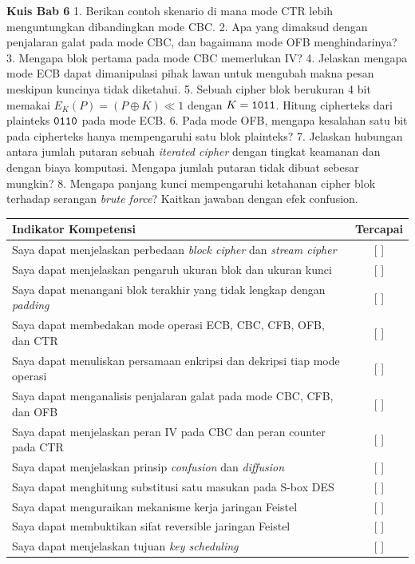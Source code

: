 
\begin{obeassessment}
\textbf{Kuis Bab 6}
1. Berikan contoh skenario di mana mode CTR lebih menguntungkan dibandingkan
   mode CBC.
2. Apa yang dimaksud dengan penjalaran galat pada mode CBC, dan bagaimana mode
   OFB menghindarinya?
3. Mengapa blok pertama pada mode CBC memerlukan IV?
4. Jelaskan mengapa mode ECB dapat dimanipulasi pihak lawan untuk mengubah
   makna pesan meskipun kuncinya tidak diketahui.
5. Sebuah cipher blok berukuran 4 bit memakai $E_K(P)=(P\oplus K)\ll 1$ dengan
   $K=\texttt{1011}$. Hitung cipherteks dari plainteks $\texttt{0110}$ pada mode
   ECB.
6. Pada mode OFB, mengapa kesalahan satu bit pada cipherteks hanya mempengaruhi
   satu blok plainteks?
7. Jelaskan hubungan antara jumlah putaran sebuah \textit{iterated cipher}
   dengan tingkat keamanan dan dengan biaya komputasi. Mengapa jumlah putaran
   tidak dibuat sebesar mungkin?
8. Mengapa panjang kunci mempengaruhi ketahanan cipher blok terhadap serangan
   \textit{brute force}? Kaitkan jawaban dengan efek confusion.
\end{obeassessment}
\begin{competencychecklist}
\begin{tabularx}{\linewidth}{|X|c|}
\hline
Indikator Kompetensi & Tercapai \\
\hline
Saya dapat menjelaskan perbedaan \textit{block cipher} dan \textit{stream cipher} & [ ] \\
\hline
Saya dapat menjelaskan pengaruh ukuran blok dan ukuran kunci & [ ] \\
\hline
Saya dapat menangani blok terakhir yang tidak lengkap dengan \textit{padding} & [ ] \\
\hline
Saya dapat membedakan mode operasi ECB, CBC, CFB, OFB, dan CTR & [ ] \\
\hline
Saya dapat menuliskan persamaan enkripsi dan dekripsi tiap mode operasi & [ ] \\
\hline
Saya dapat menganalisis penjalaran galat pada mode CBC, CFB, dan OFB & [ ] \\
\hline
Saya dapat menjelaskan peran IV pada CBC dan peran counter pada CTR & [ ] \\
\hline
Saya dapat menjelaskan prinsip \textit{confusion} dan \textit{diffusion} & [ ] \\
\hline
Saya dapat menghitung substitusi satu masukan pada S-box DES & [ ] \\
\hline
Saya dapat menguraikan mekanisme kerja jaringan Feistel & [ ] \\
\hline
Saya dapat membuktikan sifat reversible jaringan Feistel & [ ] \\
\hline
Saya dapat menjelaskan tujuan \textit{key scheduling} & [ ] \\
\hline
\end{tabularx}
\end{competencychecklist}
